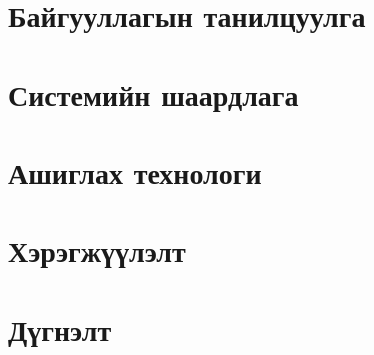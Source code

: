 
\chapter{Байгууллагын танилцуулга}


\chapter{Системийн шаардлага}


\chapter{Ашиглах технологи}


\chapter{Хэрэгжүүлэлт}


\chapter{Дүгнэлт}

